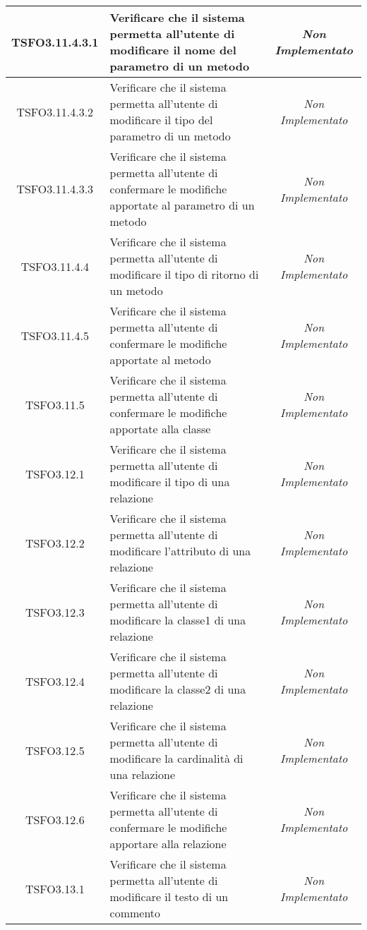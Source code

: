 \begin{longtable}{|c|>{}m{8cm}|c|}
\hypertarget{TSFO3.11.4.3.1}{TSFO3.11.4.3.1} & Verificare che il sistema permetta all'utente di modificare il nome del parametro di un metodo & \textit{Non Implementato}\\ \hline
\hypertarget{TSFO3.11.4.3.2}{TSFO3.11.4.3.2} & Verificare che il sistema permetta all'utente di modificare il tipo del parametro di un metodo & \textit{Non Implementato}\\ \hline
\hypertarget{TSFO3.11.4.3.3}{TSFO3.11.4.3.3} & Verificare che il sistema permetta all'utente di confermare le modifiche apportate al parametro di un metodo & \textit{Non Implementato}\\ \hline
\hypertarget{TSFO3.11.4.4}{TSFO3.11.4.4} & Verificare che il sistema permetta all'utente di modificare il tipo di ritorno di un metodo & \textit{Non Implementato}\\ \hline
\hypertarget{TSFO3.11.4.5}{TSFO3.11.4.5} & Verificare che il sistema permetta all'utente di confermare le modifiche apportate al metodo & \textit{Non Implementato}\\ \hline
\hypertarget{TSFO3.11.5}{TSFO3.11.5} & Verificare che il sistema permetta all'utente di confermare le modifiche apportate alla classe & \textit{Non Implementato}\\ \hline
\hypertarget{TSFO3.12.1}{TSFO3.12.1} & Verificare che il sistema permetta all'utente di modificare il tipo di una relazione & \textit{Non Implementato}\\ \hline
\hypertarget{TSFO3.12.2}{TSFO3.12.2} & Verificare che il sistema permetta all'utente di modificare l'attributo di una relazione & \textit{Non Implementato}\\ \hline
\hypertarget{TSFO3.12.3}{TSFO3.12.3} & Verificare che il sistema permetta all'utente di modificare la classe1 di una relazione & \textit{Non Implementato}\\ \hline
\hypertarget{TSFO3.12.4}{TSFO3.12.4} & Verificare che il sistema permetta all'utente di modificare la classe2 di una relazione & \textit{Non Implementato}\\ \hline
\hypertarget{TSFO3.12.5}{TSFO3.12.5} & Verificare che il sistema permetta all'utente di modificare la cardinalità di una relazione & \textit{Non Implementato}\\ \hline
\hypertarget{TSFO3.12.6}{TSFO3.12.6} & Verificare che il sistema permetta all'utente di confermare le modifiche apportare alla relazione & \textit{Non Implementato}\\ \hline
\hypertarget{TSFO3.13.1}{TSFO3.13.1} & Verificare che il sistema permetta all'utente di modificare il testo di un commento & \textit{Non Implementato}\\ \hline

\end{longtable}
